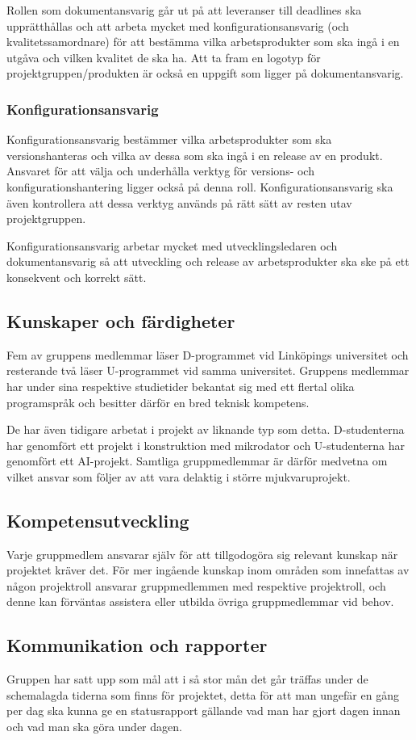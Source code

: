 \documentclass[a4paper,10pt]{article}
\begin{document}
Rollen som dokumentansvarig går ut på att leveranser till deadlines ska upprätthållas och att arbeta mycket med konfigurationsansvarig (och kvalitetssamordnare) för att bestämma vilka arbetsprodukter som ska ingå i en utgåva och vilken kvalitet de ska ha. Att ta fram en logotyp för projektgruppen/produkten är också en uppgift som ligger på dokumentansvarig.
\subsubsection{Konfigurationsansvarig}
Konfigurationsansvarig bestämmer vilka arbetsprodukter som ska versionshanteras och vilka av dessa som ska ingå i en release av en produkt. Ansvaret för att välja och underhålla verktyg för versions- och konfigurationshantering ligger också på denna roll. Konfigurationsansvarig ska även kontrollera att dessa verktyg används på rätt sätt av resten utav projektgruppen.

Konfigurationsansvarig arbetar mycket med utvecklingsledaren och dokumentansvarig så att utveckling och release av arbetsprodukter ska ske på ett konsekvent och korrekt sätt.
\subsection{Kunskaper och färdigheter}
Fem av gruppens medlemmar läser D-programmet vid Linköpings universitet och resterande två läser U-programmet vid samma universitet. Gruppens medlemmar har under sina respektive studietider bekantat sig med ett flertal olika programspråk och besitter därför en bred teknisk kompetens.

De har även tidigare arbetat i projekt av liknande typ som detta. D-studenterna har genomfört ett projekt i konstruktion med mikrodator och U-studenterna har genomfört ett AI-projekt. Samtliga gruppmedlemmar är därför medvetna om vilket ansvar som följer av att vara delaktig i större mjukvaruprojekt.
\subsection{Kompetensutveckling}
Varje gruppmedlem ansvarar själv för att tillgodogöra sig relevant kunskap när projektet kräver det. För mer ingående kunskap inom områden som innefattas av någon projektroll ansvarar gruppmedlemmen med respektive projektroll, och denne kan förväntas assistera eller utbilda övriga gruppmedlemmar vid behov.
\subsection{Kommunikation och rapporter}
Gruppen har satt upp som mål att i så stor mån det går träffas under de schemalagda tiderna som finns för projektet, detta för att man ungefär en gång per dag ska kunna ge en statusrapport gällande vad man har gjort dagen innan och vad man ska göra under dagen.
\end{document}
